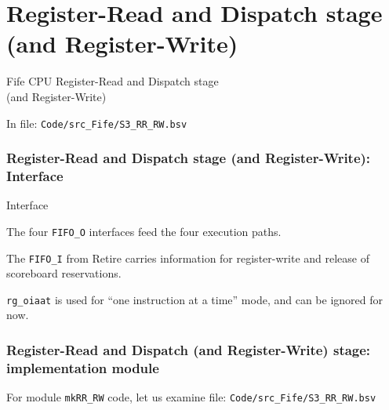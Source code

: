 \section{Register-Read and Dispatch stage (and Register-Write)}

\begin{frame}[fragile]

\begin{center}
  {\LARGE Fife CPU Register-Read and Dispatch stage \\
          (and Register-Write)}

  \vspace{10ex}

  In file: \verb|Code/src_Fife/S3_RR_RW.bsv|
\end{center}

\end{frame}


\begin{frame}[fragile]
\frametitle{Register-Read and Dispatch stage (and Register-Write): Interface}

\footnotesize

\begin{minipage}{0.725\textwidth}
\end{minipage}
\hfill
\begin{minipage}{0.25\textwidth}
Interface

\vspace{2ex}

The four \verb|FIFO_O| interfaces feed the four execution paths.

\vspace{2ex}

The \verb|FIFO_I| from Retire carries information for register-write
and release of scoreboard reservations.
\end{minipage}

\vspace{2ex}

\verb|rg_oiaat| is used for ``one instruction at a time'' mode, and can be ignored for now.

\end{frame}


\begin{frame}[fragile]
\frametitle{Register-Read and Dispatch (and Register-Write)  stage: implementation module}

\footnotesize

For module {\tt mkRR\_RW} code, let us examine file: {\tt Code/src\_Fife/S3\_RR\_RW.bsv}

\end{frame}

